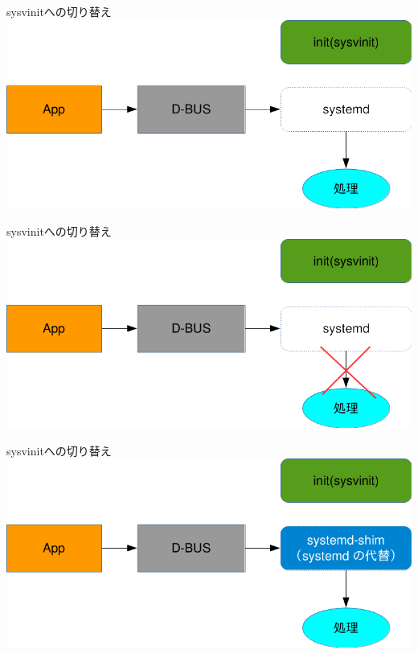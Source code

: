 \begin{frame}{sysvinitへの切り替え}
\includegraphics[width=1\hsize]{image201510/shim1.png}
\end{frame}

\begin{frame}{sysvinitへの切り替え}
\includegraphics[width=1\hsize]{image201510/shim2.png}
\end{frame}

\begin{frame}{sysvinitへの切り替え}
\includegraphics[width=1\hsize]{image201510/shim3.png}
\end{frame}

%
%
%

